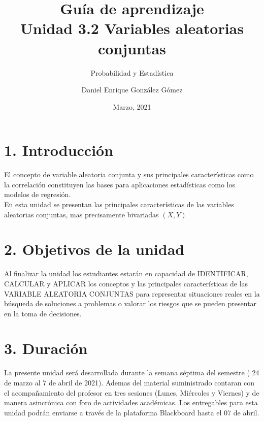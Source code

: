 \documentclass[base=hide,11pt]{elegantbook}
\title{Guía de  aprendizaje\\
	Unidad  3.2 Variables aleatorias conjuntas}
\subtitle{Probabilidad y Estadística}
\author{Daniel Enrique González Gómez}
\institute{Pontificia Universidad Javeriana Cali}
\date{Marzo, 2021}
\begin{document}

\maketitle

\frontmatter
%
\mainmatter
\section*{1. Introducción}
El concepto de variable  aleatoria  conjunta y sus principales características como la correlación constituyen las bases para aplicaciones estadísticas como los modelos de regresión.  \\ 

En esta  unidad se presentan las principales características de las variables aleatorias conjuntas, mas precisamente bivariadas $(X,Y)$\\



\section*{2. Objetivos de la unidad}

Al finalizar la unidad los estudiantes estarán  en  capacidad de IDENTIFICAR, CALCULAR y APLICAR los conceptos y las principales características  de las VARIABLE ALEATORIA CONJUNTAS para representar situaciones reales en la búsqueda de soluciones a problemas o valorar los riesgos que se pueden presentar en la toma de decisiones.


\section*{3. Duración}
La presente  unidad será desarrollada durante la semana séptima del semestre ( 24 de marzo al 7 de abril de 2021). Ademas del material suministrado  contaran con el acompañamiento del profesor en tres sesiones (Lunes, Miércoles y Viernes) y de manera asincrónica con  foro de actividades académicas. Los entregables para esta unidad podrán enviarse a través de la plataforma Blackboard hasta el  07 de abril.
\end{document}
